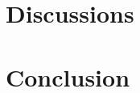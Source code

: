 \documentclass[11pt]{article}
\begin{document}
\section{Discussions}


\section{Conclusion}







\end{document}
